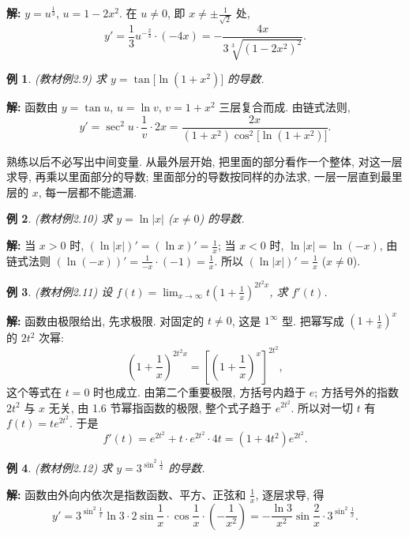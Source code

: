 \documentclass[UTF8,openany]{ctexbook}
\theoremstyle{chinesetextbook}
\newtheorem{example}{例}[section]
\newenvironment{cnsolution}{\par\indent\textbf{解:} \ignorespaces}{\par}
\begin{document}
\begin{cnsolution}
$y=u^{\frac13}$, $u=1-2x^2$. 在 $u\ne0$, 即 $\displaystyle x\ne\pm\frac1{\sqrt2}$ 处,
\[
y'=\frac13u^{-\frac23}\cdot(-4x)=-\frac{4x}{3\sqrt[3]{(1-2x^2)^2}}.
\]
\end{cnsolution}
\begin{example}\label{ex:c2-2-9}
\textnormal{(教材例2.9)} 求 $y=\tan\bigl[\ln(1+x^2)\bigr]$ 的导数.
\end{example}
\begin{cnsolution}
函数由 $y=\tan u$, $u=\ln v$, $v=1+x^2$ 三层复合而成. 由链式法则,
\[
y'=\sec^2u\cdot\frac1v\cdot2x=\frac{2x}{(1+x^2)\cos^2\bigl[\ln(1+x^2)\bigr]}.
\]
\end{cnsolution}
熟练以后不必写出中间变量. 从最外层开始, 把里面的部分看作一个整体, 对这一层求导, 再乘以里面部分的导数; 里面部分的导数按同样的办法求, 一层一层直到最里层的 $x$, 每一层都不能遗漏.
\begin{example}\label{ex:c2-2-10}
\textnormal{(教材例2.10)} 求 $y=\ln|x|$ ($x\ne0$) 的导数.
\end{example}
\begin{cnsolution}
当 $x>0$ 时, $\displaystyle(\ln|x|)'=(\ln x)'=\frac1x$; 当 $x<0$ 时, $\ln|x|=\ln(-x)$, 由链式法则 $\displaystyle(\ln(-x))'=\frac1{-x}\cdot(-1)=\frac1x$. 所以 $\displaystyle(\ln|x|)'=\frac1x$ ($x\ne0$).
\end{cnsolution}
\begin{example}\label{ex:c2-2-11}
\textnormal{(教材例2.11)} 设 $\displaystyle f(t)=\lim_{x\to\infty}t\left(1+\frac1x\right)^{2t^2x}$, 求 $f'(t)$.
\end{example}
\begin{cnsolution}
函数由极限给出, 先求极限. 对固定的 $t\ne0$, 这是 $1^\infty$ 型. 把幂写成 $\displaystyle\left(1+\frac1x\right)^x$ 的 $2t^2$ 次幂:
\[
\left(1+\frac1x\right)^{2t^2x}=\left[\left(1+\frac1x\right)^x\right]^{2t^2},
\]
这个等式在 $t=0$ 时也成立. 由第二个重要极限, 方括号内趋于 $e$; 方括号外的指数 $2t^2$ 与 $x$ 无关, 由 1.6 节幂指函数的极限, 整个式子趋于 $e^{2t^2}$. 所以对一切 $t$ 有 $f(t)=te^{2t^2}$. 于是
\[
f'(t)=e^{2t^2}+t\cdot e^{2t^2}\cdot4t=(1+4t^2)e^{2t^2}.
\]
\end{cnsolution}
\begin{example}\label{ex:c2-2-12}
\textnormal{(教材例2.12)} 求 $y=3^{\sin^2\frac1x}$ 的导数.
\end{example}
\begin{cnsolution}
函数由外向内依次是指数函数、平方、正弦和 $\displaystyle\frac1x$, 逐层求导, 得
\[
y'=3^{\sin^2\frac1x}\ln3\cdot2\sin\frac1x\cdot\cos\frac1x\cdot\left(-\frac1{x^2}\right)=-\frac{\ln3}{x^2}\sin\frac2x\cdot3^{\sin^2\frac1x}.
\]
\end{cnsolution}
\end{document}

